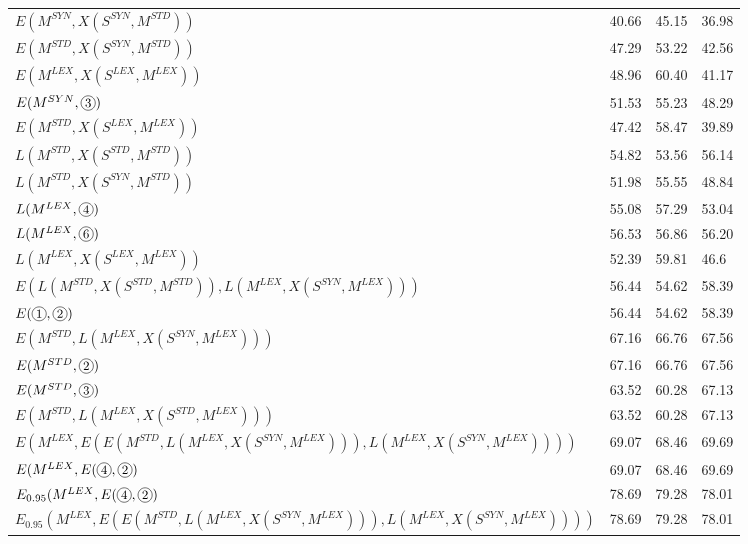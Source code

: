 \begin{table*}[]
\begin{tabular}{@{\makebox[1.25em][l]{\rownumber\space}}llll@{}}
$E(M^{SYN}, X(S^{SYN}, M^{STD}))$      & 40.66	&	45.15	&	36.98          \\ 
$E(M^{STD}, X(S^{SYN}, M^{STD}))$      & 47.29	&	53.22	&	42.56           \\
\midrule
$E(M^{LEX}, X(S^{LEX}, M^{LEX}))$      & 48.96	&	60.40	&	41.17           \\
\gdef\rownumber{\circlednumber{\stepcounter{magicrownumbers}\arabic{magicrownumbers}}}%
$E(M^{SYN}, \circlednumber{3})$      & 51.53	&	55.23	&	48.29          \\ 
$E(M^{STD}, X(S^{LEX}, M^{LEX}))$      & 47.42	&	58.47	&	39.89           \\

%

$L(M^{STD}, X(S^{STD}, M^{STD}))$      & 54.82           & 53.56          & 56.14           \\ 
$L(M^{STD}, X(S^{SYN}, M^{STD}))$      & 51.98           & 55.55           & 48.84           \\  
$L(M^{LEX}, \circlednumber{4})$      & 55.08           & 57.29          & 53.04           \\ 
$L(M^{LEX}, \circlednumber{6})$      & 56.53           & 56.86           & 56.20           \\  
$L(M^{LEX}, X(S^{LEX}, M^{LEX}))$      & 52.39           & 59.81           & 46.6	           \\  
\midrule


$E(L(M^{STD}, X(S^{STD}, M^{STD})), L(M^{LEX}, X(S^{SYN}, M^{LEX})))$       & 56.44          & 54.62           & 58.39	          \\
$E(\circlednumber{1}, \circlednumber{2})$       & 56.44          & 54.62           & 58.39	          \\
 \midrule

$E(M^{STD}, L(M^{LEX}, X(S^{SYN}, M^{LEX})))$      & 67.16          & 66.76           & 67.56	          \\
$E(M^{STD}, \circlednumber{2})$      & 67.16          & 66.76           & 67.56	          \\
$E(M^{STD}, \circlednumber{3})$      & 63.52          & 60.28           & 67.13	          \\ 
$E(M^{STD}, L(M^{LEX}, X(S^{STD}, M^{LEX})))$      & 63.52          & 60.28           & 67.13	          \\
\midrule

$E(M^{LEX}, E(E(M^{STD}, L(M^{LEX}, X(S^{SYN}, M^{LEX}))), L(M^{LEX}, X(S^{SYN}, M^{LEX}))))$       & 69.07          & 68.46           & 69.69         \\
$E(M^{LEX}, E(\circlednumber{4}, \circlednumber{2})$       & 69.07          & 68.46           & 69.69         \\
$E_{0.95}(M^{LEX}, E(\circlednumber{4}, \circlednumber{2})$       & 78.69          & 79.28           & 78.01         \\
$E_{0.95}(M^{LEX}, E(E(M^{STD}, L(M^{LEX}, X(S^{SYN}, M^{LEX}))), L(M^{LEX}, X(S^{SYN}, M^{LEX}))))$       & 78.69          & 79.28           & 78.01         \\


\end{tabular}
\end{table*}

